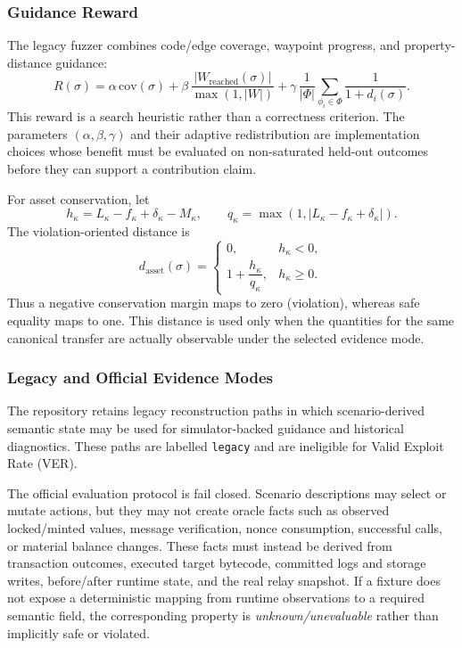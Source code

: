 \subsubsection{Guidance Reward}

The legacy fuzzer combines code/edge coverage, waypoint progress, and property-distance guidance:
\begin{equation}
    R(\sigma)=\alpha\,\mathrm{cov}(\sigma)
      +\beta\,\frac{|W_{\mathrm{reached}}(\sigma)|}{\max(1,|W|)}
      +\gamma\,\frac{1}{|\Phi|}\sum_{\phi_i\in\Phi}\frac{1}{1+d_i(\sigma)}.
\end{equation}
This reward is a search heuristic rather than a correctness criterion. The parameters $(\alpha,\beta,\gamma)$ and their adaptive redistribution are implementation choices whose benefit must be evaluated on non-saturated held-out outcomes before they can support a contribution claim.

For asset conservation, let
\begin{equation}
    h_{\kappa}=L_{\kappa}-f_{\kappa}+\delta_{\kappa}-M_{\kappa},
    \qquad
    q_{\kappa}=\max\left(1,|L_{\kappa}-f_{\kappa}+\delta_{\kappa}|\right).
\end{equation}
The violation-oriented distance is
\begin{equation}
 d_{\mathrm{asset}}(\sigma)=
 \begin{cases}
  0, & h_{\kappa}<0,\\[3pt]
  1+\dfrac{h_{\kappa}}{q_{\kappa}}, & h_{\kappa}\ge 0.
 \end{cases}
\end{equation}
Thus a negative conservation margin maps to zero (violation), whereas safe equality maps to one. This distance is used only when the quantities for the same canonical transfer are actually observable under the selected evidence mode.

\subsubsection{Legacy and Official Evidence Modes}

The repository retains legacy reconstruction paths in which scenario-derived semantic state may be used for simulator-backed guidance and historical diagnostics. These paths are labelled \texttt{legacy} and are ineligible for Valid Exploit Rate (VER).

The official evaluation protocol is fail closed. Scenario descriptions may select or mutate actions, but they may not create oracle facts such as observed locked/minted values, message verification, nonce consumption, successful calls, or material balance changes. These facts must instead be derived from transaction outcomes, executed target bytecode, committed logs and storage writes, before/after runtime state, and the real relay snapshot. If a fixture does not expose a deterministic mapping from runtime observations to a required semantic field, the corresponding property is \emph{unknown/unevaluable} rather than implicitly safe or violated.

